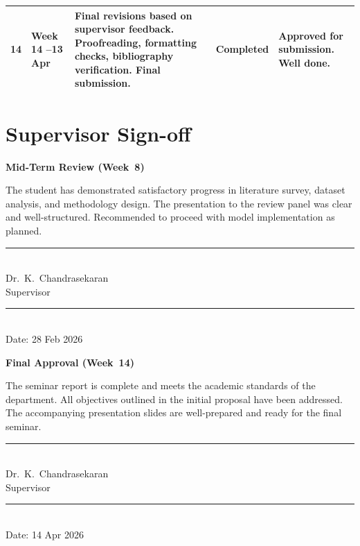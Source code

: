 \documentclass[12pt,a4paper]{report}
\newcommand{\progressdone}{\textcolor{accent2}{\faCheckCircle}\hspace{2pt}Completed}
\newenvironment{signoffblock}[1]
  {\par\vspace{10pt}\noindent\begin{tcolorbox}[
    colback=black!2,
    colframe=lightgray,
    boxrule=0.6pt,
    arc=3pt,
    width=\linewidth,
    before skip=10pt,
    after skip=10pt,
  ]\textbf{#1}\par\vspace{6pt}}
  {\end{tcolorbox}}
\begin{document}
\begin{longtable}{@{}c >{\raggedright}p{2.2cm} >{\raggedright}p{6cm} >{\raggedright}p{2.2cm} >{\raggedright\arraybackslash}p{2.5cm}@{}}
\rowcolor{white}    14 & Week 14 \newline 7--13 Apr    & Final revisions based on supervisor feedback. Proofreading, formatting checks, bibliography verification. Final submission.                           & \progressdone  & Approved for submission. Well done. \\
\bottomrule
\end{longtable}
\normalsize

\section{Supervisor Sign-off}

\vspace{4pt}
\begin{signoffblock}{Mid-Term Review (Week~8)}
\noindent The student has demonstrated satisfactory progress in literature survey, dataset analysis, and methodology design. The presentation to the review panel was clear and well-structured. Recommended to proceed with model implementation as planned.

\vspace{16pt}
\noindent
\begin{minipage}[t]{0.45\textwidth}
  \centering
  \rule{0.8\textwidth}{0.4pt}\\[4pt]
  {\small\color{graytext} Dr.\ K.\ Chandrasekaran}\\[2pt]
  {\footnotesize\color{graytext} Supervisor}
\end{minipage}
\hfill
\begin{minipage}[t]{0.45\textwidth}
  \centering
  \rule{0.8\textwidth}{0.4pt}\\[4pt]
  {\small\color{graytext} Date: 28 Feb 2026}
\end{minipage}
\end{signoffblock}

\vspace{4pt}
\begin{signoffblock}{Final Approval (Week~14)}
\noindent The seminar report is complete and meets the academic standards of the department. All objectives outlined in the initial proposal have been addressed. The accompanying presentation slides are well-prepared and ready for the final seminar.

\vspace{16pt}
\noindent
\begin{minipage}[t]{0.45\textwidth}
  \centering
  \rule{0.8\textwidth}{0.4pt}\\[4pt]
  {\small\color{graytext} Dr.\ K.\ Chandrasekaran}\\[2pt]
  {\footnotesize\color{graytext} Supervisor}
\end{minipage}
\hfill
\begin{minipage}[t]{0.45\textwidth}
  \centering
  \rule{0.8\textwidth}{0.4pt}\\[4pt]
  {\small\color{graytext} Date: 14 Apr 2026}
\end{minipage}
\end{signoffblock}
\end{document}
